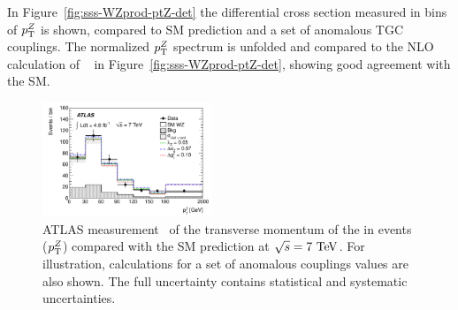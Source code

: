 \begin{table}[htp]
\begin{center}
\caption{Summary of measured fiducial and total $\WZ$ production cross sections from ATLAS 
at 7 TeV center-of-mass energies in the $\ll\lnu$ final state. The fiducial definitions differ from the 7 and 8 TeV analysis. Furthermore, the 7 TeV analysis
quotes the sum for the $e$ and $\mu$ channels, the 8 TeV analysis quotes the combination of channels. Thus, the two fiducial cross sections cannot be 
compared directly.}
\end{center}
\label{tab:sss-WZprod-xsec}
\end{table}%


In Figure~\ref{fig:sss-WZprod-ptZ-det} the differential cross section measured in bins of 
$p_{\mathrm{T}}^Z$ is shown, compared to SM prediction and a set of anomalous TGC couplings. 
The normalized $p_{\mathrm{T}}^Z$ spectrum is unfolded and compared to the NLO calculation
of \mcatnlo~\cite{Frixione:2002ik} in 
Figure~\ref{fig:sss-WZprod-ptZ-det}, showing good agreement with the SM.


\begin{figure}[htbp]
  \begin{center}
  \includegraphics[width=0.45\textwidth]{figures/sss-inclboson-diboson-wzprod-ptZ-det.pdf}
  \caption{ATLAS measurement~\cite{Aad:2012twa} of the transverse momentum of the \Zboson\; in \WZ\; events ($p_{\mathrm{T}}^Z$) compared with the SM prediction at $\rts = 7\TeV$. For illustration, calculations for a set of anomalous couplings values are also shown. The full uncertainty contains statistical and systematic uncertainties.}
\label{fig:sss-WZprod-ptZ}
\end{center}
\end{figure}

